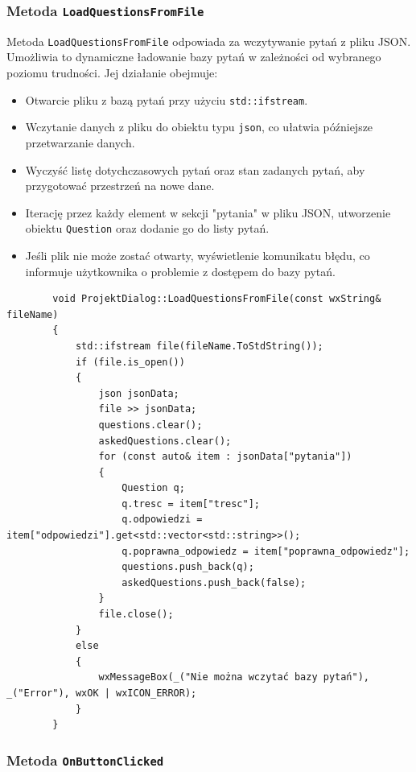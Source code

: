 \documentclass[]{article}
\begin{document}
\subsubsection{Metoda \texttt{LoadQuestionsFromFile}}

Metoda \texttt{LoadQuestionsFromFile} odpowiada za wczytywanie pytań z pliku JSON. Umożliwia to dynamiczne ładowanie bazy pytań w zależności od wybranego poziomu trudności. Jej działanie obejmuje:
\begin{itemize}
	\item Otwarcie pliku z bazą pytań przy użyciu \texttt{std::ifstream}.
	\item Wczytanie danych z pliku do obiektu typu \texttt{json}, co ułatwia późniejsze przetwarzanie danych.
	\item Wyczyść listę dotychczasowych pytań oraz stan zadanych pytań, aby przygotować przestrzeń na nowe dane.
	\item Iterację przez każdy element w sekcji "pytania" w pliku JSON, utworzenie obiektu \texttt{Question} oraz dodanie go do listy pytań.
	\item Jeśli plik nie może zostać otwarty, wyświetlenie komunikatu błędu, co informuje użytkownika o problemie z dostępem do bazy pytań.
\end{itemize}
	
	\begin{verbatim}
		void ProjektDialog::LoadQuestionsFromFile(const wxString& fileName)
		{
			std::ifstream file(fileName.ToStdString());
			if (file.is_open())
			{
				json jsonData;
				file >> jsonData;
				questions.clear();
				askedQuestions.clear();
				for (const auto& item : jsonData["pytania"])
				{
					Question q;
					q.tresc = item["tresc"];
					q.odpowiedzi = item["odpowiedzi"].get<std::vector<std::string>>();
					q.poprawna_odpowiedz = item["poprawna_odpowiedz"];
					questions.push_back(q);
					askedQuestions.push_back(false);
				}
				file.close();
			}
			else
			{
				wxMessageBox(_("Nie można wczytać bazy pytań"), _("Error"), wxOK | wxICON_ERROR);
			}
		}
	\end{verbatim}
	\subsubsection{Metoda \texttt{OnButtonClicked}}
\end{document}
